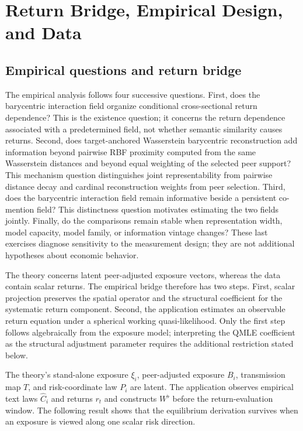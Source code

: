 \section{Return Bridge, Empirical Design, and Data}
\label{sec:identification-estimation}

\subsection{Empirical questions and return bridge}
\label{sec:exposures-to-returns}

The empirical analysis follows four successive questions.
First, does the barycentric interaction field organize conditional
cross-sectional return dependence?
This is the existence question; it concerns the return dependence associated
with a predetermined field, not whether semantic similarity causes returns.
Second, does target-anchored Wasserstein barycentric reconstruction add
information beyond pairwise RBF proximity computed from the same Wasserstein
distances and beyond equal weighting of the selected peer support?
This mechanism question distinguishes joint representability from pairwise
distance decay and cardinal reconstruction weights from peer selection.
Third, does the barycentric interaction field remain informative beside a
persistent co-mention field?
This distinctness question motivates estimating the two fields jointly.
Finally, do the comparisons remain stable when representation width, model
capacity, model family, or information vintage changes?
These last exercises diagnose sensitivity to the measurement design; they are
not additional hypotheses about economic behavior.

The theory concerns latent peer-adjusted exposure vectors, whereas the data
contain scalar returns.
The empirical bridge therefore has two steps.
First, scalar projection preserves the spatial operator and the structural
coefficient for the systematic return component.
Second, the application estimates an observable return equation under a
spherical working quasi-likelihood.
Only the first step follows algebraically from the exposure model; interpreting
the QMLE coefficient as the structural adjustment parameter requires the
additional restriction stated below.

The theory's stand-alone exposure $\xi_i$, peer-adjusted exposure $B_i$,
transmission map $T$, and risk-coordinate law $P_i$ are latent.
The application observes empirical text laws $\widehat C_i$ and returns $r_t$
and constructs $W^\flat$ before the return-evaluation window.
The following result shows that the equilibrium derivation survives when an
exposure is viewed along one scalar risk direction.

